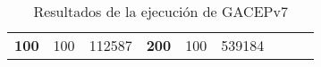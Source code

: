 \begin{table}[H]
\begin{tabular}{|ccrccrccc}
\multicolumn{1}{|c|}{\multirow{-39}{*}{\cellcolor[HTML]{FFFFC7}\textbf{100}}} & \multicolumn{1}{c|}{\multirow{-9}{*}{\cellcolor[HTML]{DDFDFF}100}} & \multicolumn{1}{r|}{\cellcolor[HTML]{DAE8FC}112587}    & \multicolumn{1}{c|}{\multirow{-39}{*}{\cellcolor[HTML]{FFFFC7}\textbf{200}}} & \multicolumn{1}{c|}{\multirow{-10}{*}{\cellcolor[HTML]{DDFDFF}100}} & \multicolumn{1}{r|}{\cellcolor[HTML]{DDFDFF}539184}    &                                                                              &                                                                    &                                                        \\ \cline{1-6}
\end{tabular}
\caption{\label{res:GACEPv7}Resultados de la ejecución de GACEPv7}
\end{table}

